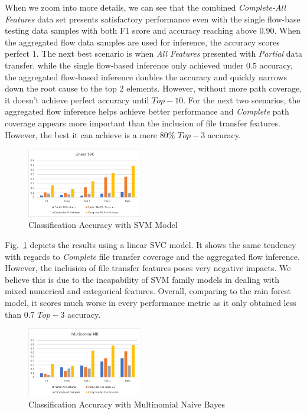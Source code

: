 When we zoom into more details, we can see that the combined {\it Complete-All Features} data set presents satisfactory performance even with the single flow-base testing data samples with 
both F1 score and accuracy reaching above $0.90$. When the aggregated flow data samples are used for inference, the accuracy scores perfect $1$. The next best scenario is when {\it All Features} presented with 
{\it Partial} data transfer, while the single flow-based inference only achieved under $0.5$ accuracy, the aggregated flow-based inference doubles the accuracy and quickly narrows down the root cause to the 
top $2$ elements. However, without more path coverage, it doesn't achieve perfect accuracy until $Top-10$. For the next two scenarios, the aggregated flow inference helps achieve better performance 
and {\it Complete} path coverage appears more important than the inclusion of file transfer features. However, the best it can achieve is a mere $80\%$ $Top-3$ accuracy.  

\begin{figure}[!ht]
\begin{center}
\includegraphics[width=0.45\textwidth]{./figure/svc-accuracy}
\end{center}
\caption{Classification Accuracy with SVM Model}
\label{fig:svm}
\end{figure}

Fig.~\ref{fig:svm} depicts the results using a linear SVC model. It shows the same tendency with regards to {\it Complete} file transfer coverage and the aggregated flow inference. 
However, the inclusion of file transfer features poses very negative impacts. We believe this is due to the incapability of SVM family models in dealing with mixed numerical and categorical features. 
Overall, comparing to the rain forest model, it scores much worse in every performance metric as it only obtained less than $0.7$ $Top-3$ accuracy.

\begin{figure}[!ht]
\begin{center}
\includegraphics[width=0.45\textwidth]{./figure/nb-accuracy}
\end{center}
\caption{Classification Accuracy with Multinomial Naive Bayes}
\label{fig:bn}
\end{figure}

